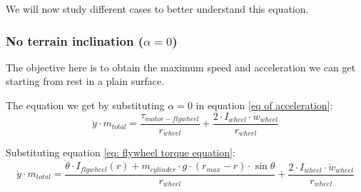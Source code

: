 We will now study different cases to better understand this equation.
\subsubsection{No terrain inclination ($\alpha = 0$)}
The objective here is to obtain the maximum speed and acceleration we can get starting from rest in a plain surface.

The equation we get by substituting $\alpha = 0$ in equation \ref{eq of acceleration}:
\[\ddot{y}\cdot m_{total} = \frac{\tau_{motor-flywheel}}{r_{wheel}} +\frac{2\cdot I_{wheel} \cdot  \dot{w}_{wheel}}{r_{wheel}}\]

Substituting equation \ref{eq: flywheel torque equation}:
\begin{equation}\label{eq: no inclintation}
    \ddot{y}\cdot m_{total} = \frac{\ddot{\theta}\cdot I_{flywheel}(r) + m_{cylinder} \cdot  g \cdot  (r_{max} - r) \cdot  \sin{\theta}}{r_{wheel}} +\frac{2\cdot I_{wheel} \cdot  \dot{w}_{wheel}}{r_{wheel}}
\end{equation}


